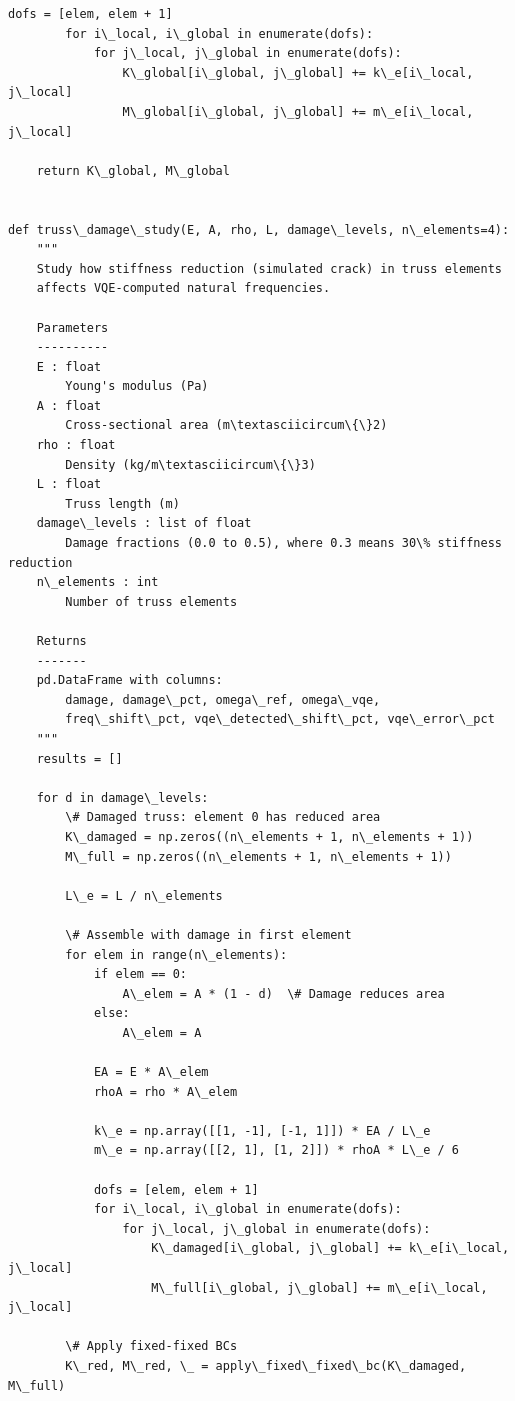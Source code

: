 \documentclass[12pt, a4paper]{article}
\begin{document}
\begin{lstlisting}[style=codestyle, caption={{novel_study.py --- Ill-Conditioning & Damage Detection}}]
        dofs = [elem, elem + 1]
        for i\_local, i\_global in enumerate(dofs):
            for j\_local, j\_global in enumerate(dofs):
                K\_global[i\_global, j\_global] += k\_e[i\_local, j\_local]
                M\_global[i\_global, j\_global] += m\_e[i\_local, j\_local]

    return K\_global, M\_global


def truss\_damage\_study(E, A, rho, L, damage\_levels, n\_elements=4):
    """
    Study how stiffness reduction (simulated crack) in truss elements
    affects VQE-computed natural frequencies.

    Parameters
    ----------
    E : float
        Young's modulus (Pa)
    A : float
        Cross-sectional area (m\textasciicircum\{\}2)
    rho : float
        Density (kg/m\textasciicircum\{\}3)
    L : float
        Truss length (m)
    damage\_levels : list of float
        Damage fractions (0.0 to 0.5), where 0.3 means 30\% stiffness reduction
    n\_elements : int
        Number of truss elements

    Returns
    -------
    pd.DataFrame with columns:
        damage, damage\_pct, omega\_ref, omega\_vqe,
        freq\_shift\_pct, vqe\_detected\_shift\_pct, vqe\_error\_pct
    """
    results = []

    for d in damage\_levels:
        \# Damaged truss: element 0 has reduced area
        K\_damaged = np.zeros((n\_elements + 1, n\_elements + 1))
        M\_full = np.zeros((n\_elements + 1, n\_elements + 1))

        L\_e = L / n\_elements

        \# Assemble with damage in first element
        for elem in range(n\_elements):
            if elem == 0:
                A\_elem = A * (1 - d)  \# Damage reduces area
            else:
                A\_elem = A

            EA = E * A\_elem
            rhoA = rho * A\_elem

            k\_e = np.array([[1, -1], [-1, 1]]) * EA / L\_e
            m\_e = np.array([[2, 1], [1, 2]]) * rhoA * L\_e / 6

            dofs = [elem, elem + 1]
            for i\_local, i\_global in enumerate(dofs):
                for j\_local, j\_global in enumerate(dofs):
                    K\_damaged[i\_global, j\_global] += k\_e[i\_local, j\_local]
                    M\_full[i\_global, j\_global] += m\_e[i\_local, j\_local]

        \# Apply fixed-fixed BCs
        K\_red, M\_red, \_ = apply\_fixed\_fixed\_bc(K\_damaged, M\_full)


\end{lstlisting}
\end{document}
